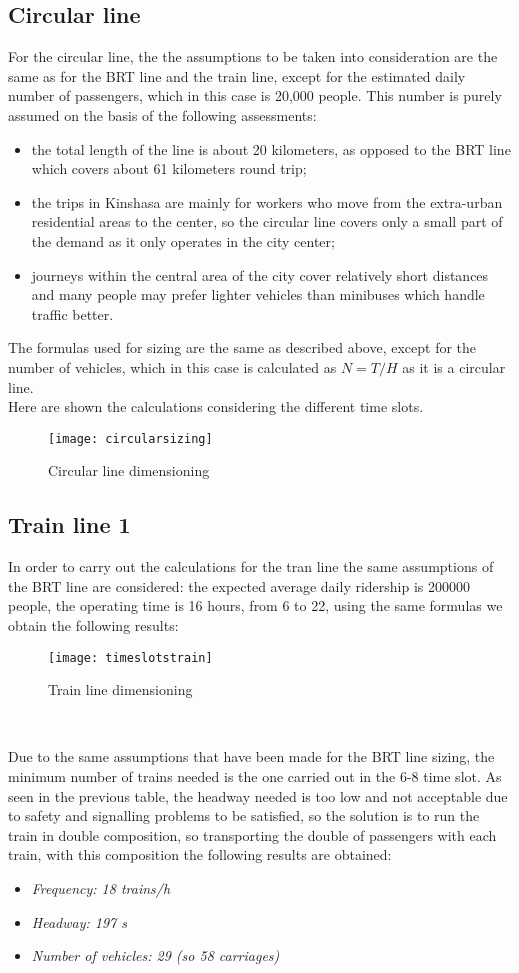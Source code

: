 \documentclass{article}
\begin{document}
\subsection{Circular line}
For the circular line, the the assumptions to be taken into consideration are the same as for the BRT line and the train line, except for the estimated daily number of passengers, which in this case is 20,000 people. This number is purely assumed on the basis of the following assessments:
\begin{itemize}
\item the total length of the line is about 20 kilometers, as opposed to the BRT line which covers about 61 kilometers round trip; \item the trips in Kinshasa are mainly for workers who move from the extra-urban residential areas to the center, so the circular line covers only a small part of the demand as it only operates in the city center; 
\item journeys within the central area of the city cover relatively short distances and many people may prefer lighter vehicles than minibuses which handle traffic better. 
\end{itemize}
The formulas used for sizing are the same as described above, except for the number of vehicles, which in this case is calculated as $N = T/H$ as it is a circular line.\\
Here are shown the calculations considering the different time slots.\\
\begin{figure}[H]
\centering
\texttt{[image: circularsizing]}
\caption{Circular line dimensioning}
\end{figure} 
\newpage
\subsection{Train line 1}
In order to carry out the calculations for the tran line the same assumptions of the BRT line are considered: the expected average daily ridership is 200000 people, the operating time is 16 hours, from 6 to 22, using the same formulas we obtain the following results:\\
\begin{figure}[H]
{\centering
\texttt{[image: timeslotstrain]}
\caption{Train line dimensioning}}
\end{figure} 
\

Due to the same assumptions that have been made for the BRT line sizing, the minimum number of trains needed is the one carried out in the 6-8 time slot. 
As seen in the previous table, the headway needed is too low and not acceptable due to safety and signalling problems to be satisfied, so the solution is to run the train in double composition, so transporting the double of passengers with each train, with this composition the following results are obtained:
\begin{itemize}
\item \textit{Frequency: 18 trains/h}
\item \textit{Headway: 197 s}
\item \textit{Number of vehicles: 29 (so 58 carriages)}
\end{itemize}
\newpage
\end{document}
